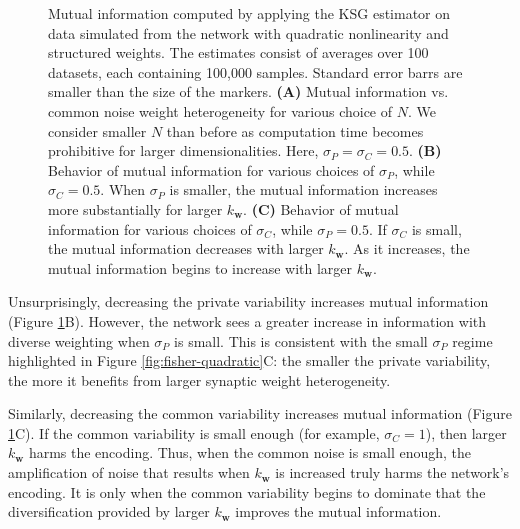 \documentclass[12pt]{article}
\begin{document}
\begin{figure}[t]
	\centering
	\caption{Mutual information computed by applying the KSG estimator on data simulated from the network with quadratic nonlinearity and structured weights. The estimates consist of averages over 100 datasets, each containing 100,000 samples. Standard error barrs are smaller than the size of the markers. \textbf{(A)} Mutual information vs. common noise weight heterogeneity for various choice of $N$. We consider smaller $N$ than before as computation time becomes prohibitive for larger dimensionalities. Here, $\sigma_P =\sigma_C=0.5$. \textbf{(B)} Behavior of mutual information for various choices of $\sigma_P$, while $\sigma_C=0.5$. When $\sigma_P$ is smaller, the mutual information increases more substantially for larger $k_{\mathbf{w}}$.  \textbf{(C)}  Behavior of mutual information for various choices of $\sigma_C$, while $\sigma_P=0.5$. If $\sigma_C$ is small, the mutual information decreases with larger $k_{\mathbf{w}}$. As it increases, the mutual information begins to increase with larger $k_{\mathbf{w}}$.}  
	\label{fig:mi_squared_struct}
\end{figure}

Unsurprisingly, decreasing the private variability increases mutual information (Figure \ref{fig:mi_squared_struct}B). However, the network sees a greater increase in information with diverse weighting when $\sigma_P$ is small. This is consistent with the small $\sigma_P$ regime highlighted in Figure \ref{fig:fisher-quadratic}C: the smaller the private variability, the more it benefits from larger synaptic weight heterogeneity. 
	
Similarly, decreasing the common variability increases mutual information (Figure \ref{fig:mi_squared_struct}C). If the common variability is small enough (for example, $\sigma_C=1$), then larger $k_{\mathbf{w}}$ harms the encoding. Thus, when the common noise is small enough, the amplification of noise that results when $k_{\mathbf{w}}$ is increased truly harms the network's encoding. It is only when the common variability begins to dominate that the diversification provided by larger $k_{\mathbf{w}}$ improves the mutual information. 
\end{document}

